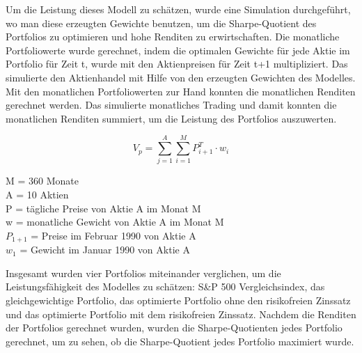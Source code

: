 \documentclass[12pt]{article}
\begin{document}
            Um die Leistung dieses Modell zu schätzen, wurde eine Simulation durchgeführt, 
            wo man diese erzeugten Gewichte benutzen, um die Sharpe-Quotient des Portfolios zu optimieren und 
            hohe Renditen zu erwirtschaften. Die monatliche Portfoliowerte wurde gerechnet, 
            indem die optimalen Gewichte für jede Aktie im Portfolio für Zeit t, 
            wurde mit den Aktienpreisen für Zeit t+1 multipliziert. 
            Das simulierte den Aktienhandel mit Hilfe von den erzeugten Gewichten des Modelles. 
            Mit den monatlichen Portfoliowerten zur Hand konnten die monatlichen Renditen gerechnet werden. 
            Das simulierte monatliches Trading und damit konnten die monatlichen Renditen summiert, 
            um die Leistung des Portfolios auszuwerten.

            \begin{Large} \[ V_p = \sum_{j=1}^{A}\sum_{i=1}^{M}P^T_{i+1} \cdot w_i \] \end{Large}

            \begin{multicols}{2}
                \begin{footnotesize}
                    
                    \noindent M = 360 Monate \\
                    A = 10 Aktien \\
                    P = tägliche Preise von Aktie A im Monat M \\
                    w = monatliche Gewicht von Aktie A im Monat M \\
                    $P_{1+1}$ = Preise im Februar 1990 von Aktie A \\
                    $w_1$ = Gewicht im Januar 1990 von Aktie A 

                \end{footnotesize}
            \end{multicols}

            Insgesamt wurden vier Portfolios miteinander verglichen, 
            um die Leistungsfähigkeit des Modelles zu schätzen: S\&P 500 Vergleichsindex, 
            das gleichgewichtige Portfolio, das optimierte Portfolio ohne den risikofreien Zinssatz und 
            das optimierte Portfolio mit dem risikofreien Zinssatz. Nachdem die Renditen der Portfolios gerechnet wurden, 
            wurden die Sharpe-Quotienten jedes Portfolio gerechnet, um zu sehen, ob die Sharpe-Quotient jedes Portfolio maximiert wurde.
\end{document}
